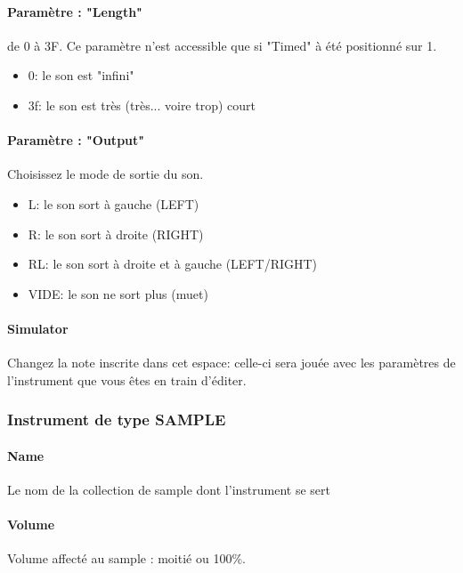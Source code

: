 \documentclass[12pt,a4paper]{article}
\begin{document}
        \paragraph{Paramètre : "Length"} de 0 à 3F. Ce paramètre n'est accessible que si "Timed" à été positionné sur 1.
            \begin{itemize}
                \item{0: le son est "infini"}
                \item{3f: le son est très (très... voire trop) court}
            \end{itemize}

        \paragraph{Paramètre : "Output"} Choisissez le mode de sortie du son.
            \begin{itemize}
                \item{L: le son sort à gauche (LEFT)}
                \item{R: le son sort à droite (RIGHT)}
                \item{RL: le son sort à droite et à gauche (LEFT/RIGHT)}
                \item{VIDE: le son ne sort plus (muet)}
            \end{itemize}

        \paragraph{Simulator} Changez la note inscrite dans cet espace: celle-ci sera jouée avec les paramètres de l'instrument que vous êtes en train d'éditer.

        \subsubsection{Instrument de type SAMPLE}


        \paragraph{Name} Le nom de la collection de sample dont l'instrument se sert

        \paragraph{Volume} Volume affecté au sample : moitié ou 100\%.
\end{document}

